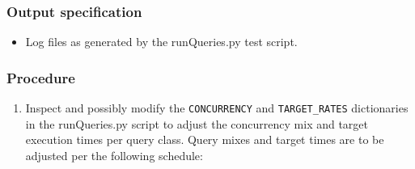 \subsubsection{Output specification}

\begin{itemize}
  \item{Log files as generated by the runQueries.py test script.}
\end{itemize}

\subsubsection{Procedure}

\begin{enumerate}

  \item{Inspect and possibly modify the \texttt{CONCURRENCY} and \texttt{TARGET\_RATES} dictionaries in
  the runQueries.py script to adjust the concurrency mix and target execution times per query class.  Query
  mixes and target times are to be adjusted per the following schedule:

}
\end{enumerate}
